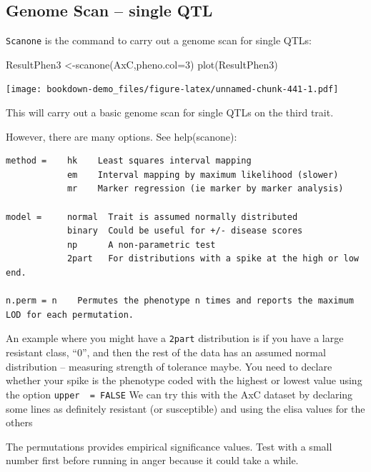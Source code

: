 \documentclass[
]{book}
\newenvironment{Shaded}{\begin{snugshade}}{\end{snugshade}}
\newcommand{\AttributeTok}[1]{\textcolor[rgb]{0.77,0.63,0.00}{#1}}
\newcommand{\DecValTok}[1]{\textcolor[rgb]{0.00,0.00,0.81}{#1}}
\newcommand{\FunctionTok}[1]{\textcolor[rgb]{0.00,0.00,0.00}{#1}}
\newcommand{\NormalTok}[1]{#1}
\newcommand{\OtherTok}[1]{\textcolor[rgb]{0.56,0.35,0.01}{#1}}
\begin{document}
\hypertarget{genome-scan-single-qtl}{%
\subsection{Genome Scan -- single QTL}\label{genome-scan-single-qtl}}

\texttt{Scanone} is the command to carry out a genome scan for single QTLs:

\begin{Shaded}
\begin{Highlighting}[]
\NormalTok{ResultPhen3 }\OtherTok{\textless{}{-}}\FunctionTok{scanone}\NormalTok{(AxC,}\AttributeTok{pheno.col=}\DecValTok{3}\NormalTok{) }
\FunctionTok{plot}\NormalTok{(ResultPhen3)}
\end{Highlighting}
\end{Shaded}

\texttt{[image: bookdown-demo\_files/figure-latex/unnamed-chunk-441-1.pdf]}

This will carry out a basic genome scan for single QTLs on the third trait.

However, there are many options. See help(scanone):

\begin{verbatim}
method =    hk    Least squares interval mapping   
            em    Interval mapping by maximum likelihood (slower)   
            mr    Marker regression (ie marker by marker analysis) 

model =     normal  Trait is assumed normally distributed                   
            binary  Could be useful for +/- disease scores
            np      A non-parametric test 
            2part   For distributions with a spike at the high or low end.   

n.perm = n    Permutes the phenotype n times and reports the maximum LOD for each permutation. 
\end{verbatim}

An example where you might have a \texttt{2part} distribution is if you have a large resistant class, ``0'', and then the rest of the data has an assumed normal distribution -- measuring strength of tolerance maybe. You need to declare whether your spike is the phenotype coded with the highest or lowest value using the option \texttt{upper\ \ =\ FALSE} We can try this with the AxC dataset by declaring some lines as definitely resistant (or susceptible) and using the elisa values for the others

The permutations provides empirical significance values. Test with a small number first before running in anger because it could take a while.
\end{document}
